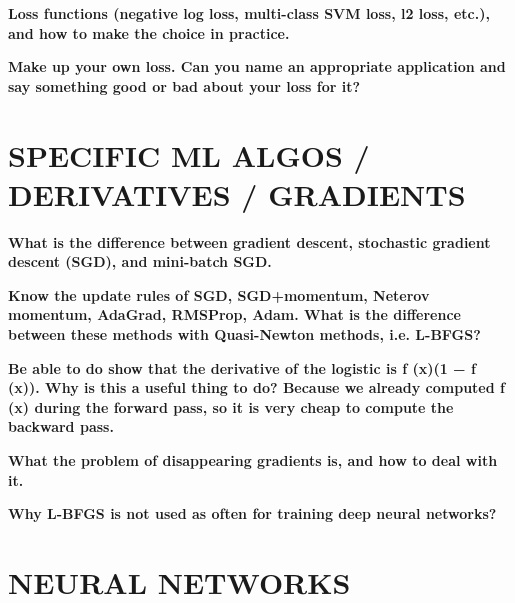 \documentclass[10pt,letterpaper]{article}
\begin{document}
\subitem \textbf{ Loss functions (negative log loss, multi-class SVM loss, l2 loss, etc.), and how to make the choice in practice.}
\begin{solution}
\end{solution}

\subitem \textbf{ Make up your own loss. Can you name an appropriate application and say something good or bad about your loss for it?}
\begin{solution}
\end{solution}

\section{SPECIFIC ML ALGOS / DERIVATIVES / GRADIENTS}
\subitem \textbf{ What is the difference between gradient descent, stochastic gradient descent (SGD), and mini-batch SGD.}
\begin{solution}
\end{solution}

\subitem \textbf{ Know the update rules of SGD, SGD+momentum, Neterov momentum, AdaGrad, RMSProp, Adam. What is the difference between these methods with Quasi-Newton methods, i.e. L-BFGS?}
\begin{solution}
\end{solution}

\subitem \textbf{ Be able to do show that the derivative of the logistic is f (x)(1 − f (x)). Why is this a useful thing to do? Because we already computed f (x) during the forward pass, so it is very cheap to compute the backward pass.}
\begin{solution}
\end{solution}

\subitem \textbf{ What the problem of disappearing gradients is, and how to deal with it.}
\begin{solution}
\end{solution}

\subitem \textbf{ Why L-BFGS is not used as often for training deep neural networks?}
\begin{solution}
\end{solution}

\section{NEURAL NETWORKS}
\end{document}
